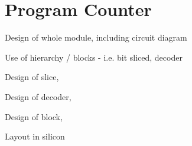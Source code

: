 
\section{Program Counter}


Design of whole module, including circuit diagram

Use of hierarchy / blocks - i.e. bit sliced, decoder

Design of slice,

Design of decoder,

Design of block,

Layout in silicon
